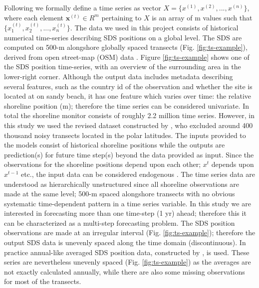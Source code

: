 \documentclass[format=sigconf, review=false, screen=true]{acmart}
\begin{document}
Following \citet{malhotra2015long} we formally define a time series as vector $X = \{x^{(1)}, x^{(2)},..., x^{(n)}\}$, where each element $\mathbf{x}^{(t)} \in R^{m}$ pertaining to $X$ is an array of m values such that $\{x_1^{(t)}, x_2^{(t)},..., x_n^{(t)} \}$. The data we used in this project consists of historical numerical time-series describing SDS positions on a global level. The SDS are computed on 500-m alongshore globally spaced transects (Fig. \ref{fig:ts-example}), derived from open street-map (OSM) data \cite{Luijendijk2018state}. Figure \ref{fig:ts-example} shows one of the SDS position time-series, with an overview of the surrounding area in the lower-right corner. Although the output data includes metadata describing several features, such as the country id of the observation and whether the site is located at on sandy beach, it has one feature which varies over time: the relative shoreline position (m); therefore the time series can be considered univariate. In total the shoreline monitor consists of roughly 2.2 million time series. However, in this study we used the revised dataset constructed by \citet{Kras2019shoreline}, who excluded around 400 thousand noisy transects located in the polar latitudes. The inputs provided to the models consist of historical shoreline positions while the outputs are prediction(s) for future time step(s) beyond the data provided as input. Since the observations for the shoreline positions depend upon each other; $x^{t}$ depends upon $x^{t-1}$ etc., the input data can be considered endogenous \citep{brownlee2018deep}. The time series data are understood as hierarchically unstructured \citep{pmlr-v89-mariet19a} since all shoreline observations are made at the same level; 500-m spaced alongshore transects with no obvious systematic time-dependent pattern in a time series variable. In this study we are interested in forecasting more than one time-step (1 yr) ahead; therefore this it can be characterized as a multi-step forecasting problem. The SDS position observations are made at an irregular interval (Fig. \ref{fig:ts-example}); therefore the output SDS data is unevenly spaced along the time domain (discontinuous). In practice annual-like averaged SDS position data, constructed by \citet{Luijendijk2018state}, is used. These series are nevertheless unevenly spaced (Fig. \ref{fig:ts-example}) as the averages are not exactly calculated annually, while there are also some missing observations for most of the transects.
\end{document}
